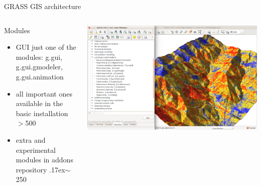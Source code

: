 \documentclass[xcolor={dvipsnames,usenames},beamer,aspectratio=169]{beamer}
\begin{document}
\begin{frame}{GRASS GIS architecture}

\begin{columns}
\begin{column}{0.4\textwidth}

\begin{block}{Modules}
 \begin{itemize}
  \item GUI just one of the modules: g.gui, g.gui.gmodeler, g.gui.animation
  \item all important ones available in the basic installation $>$500
  \item extra and experimental modules in addons repository {\raise.17ex\hbox{$\scriptstyle\sim$}}250
\end{itemize}



\end{block}

\end{column}
\begin{column}{0.45\textwidth}

\begin{center}
  \includegraphics[width=\textwidth]{grass/count_and_modules}
\end{center}

\end{column}
\end{columns}

\end{frame}
\end{document}
